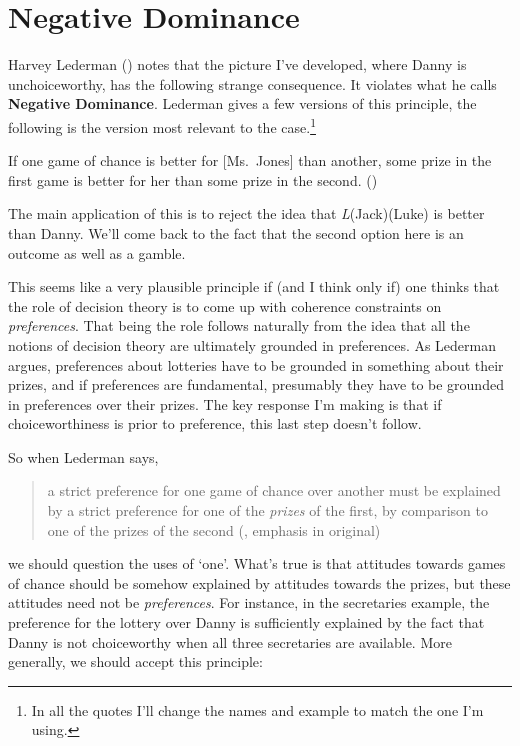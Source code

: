\documentclass[
  11pt,
  letterpaper,
  DIV=11,
  numbers=noendperiod,
  twoside]{scrartcl}
\providecommand{\tightlist}{%
  \setlength{\itemsep}{0pt}\setlength{\parskip}{0pt}}
\begin{document}
\section{Negative Dominance}\label{sec-negdom}

Harvey Lederman () notes that
the picture I've developed, where Danny is unchoiceworthy, has the
following strange consequence. It violates what he calls
\textbf{Negative Dominance}. Lederman gives a few versions of this
principle, the following is the version most relevant to the
case.\footnote{In all the quotes I'll change the names and example to
  match the one I'm using.}

\begin{description}
\tightlist
\item[Negative Dominance (Goodness)]
If one game of chance is better for {[}Ms.~Jones{]} than another, some
prize in the first game is better for her than some prize in the second.
()
\end{description}

The main application of this is to reject the idea that
\emph{L}(Jack)(Luke) is better than Danny. We'll come back to the fact
that the second option here is an outcome as well as a gamble.

This seems like a very plausible principle if (and I think only if) one
thinks that the role of decision theory is to come up with coherence
constraints on \emph{preferences}. That being the role follows naturally
from the idea that all the notions of decision theory are ultimately
grounded in preferences. As Lederman argues, preferences about lotteries
have to be grounded in something about their prizes, and if preferences
are fundamental, presumably they have to be grounded in preferences over
their prizes. The key response I'm making is that if choiceworthiness is
prior to preference, this last step doesn't follow.

So when Lederman says,

\begin{quote}
a strict preference for one game of chance over another must be
explained by a strict preference for one of the \emph{prizes} of the
first, by comparison to one of the prizes of the second
(, emphasis in
original)
\end{quote}

we should question the uses of `one'. What's true is that attitudes
towards games of chance should be somehow explained by attitudes towards
the prizes, but these attitudes need not be \emph{preferences}. For
instance, in the secretaries example, the preference for the lottery
over Danny is sufficiently explained by the fact that Danny is not
choiceworthy when all three secretaries are available. More generally,
we should accept this principle:
\end{document}
